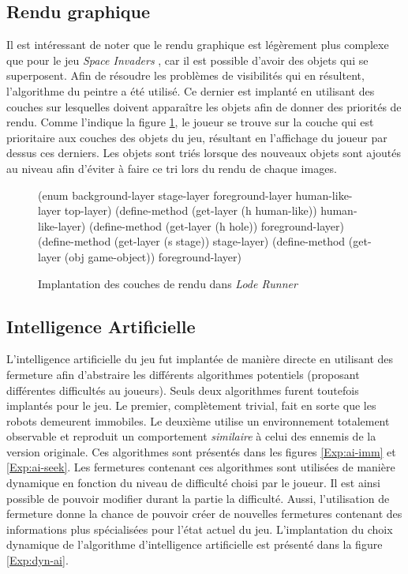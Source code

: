 \documentclass[12pt,oneside,letterpaper,francais]{book}
\newcommand{\lr}{{\textit{Lode Runner }}}
\newcommand{\si}{{\textit{Space Invaders }}}
\newcommand{\scheme}[1]{\selectlanguage{english}{\tt #1}\selectlanguage{french}}
\begin{document}
\subsection{Rendu graphique}

Il est intéressant de noter que le rendu graphique est légèrement plus
complexe que pour le jeu \si, car il est possible d'avoir des objets
qui se superposent. Afin de résoudre les problèmes de visibilités qui
en résultent, l'algorithme du peintre a été utilisé. Ce dernier est
implanté en utilisant des couches sur lesquelles doivent apparaître
les objets afin de donner des priorités de rendu. Comme l'indique la
figure \ref{Exp:layers}, le joueur se trouve sur la couche
\scheme{human-like-layer} qui est prioritaire aux couches des objets
du jeu, résultant en l'affichage du joueur par dessus ces
derniers. Les objets sont triés lorsque des nouveaux objets sont
ajoutés au niveau afin d'éviter à faire ce tri lors du rendu de chaque
images.

\begin{figure}[htb!]
  \begin{schemecode}
(enum background-layer stage-layer foreground-layer human-like-layer top-layer)
(define-method (get-layer (h human-like))    human-like-layer)
(define-method (get-layer (h hole))          foreground-layer)
(define-method (get-layer (s stage))         stage-layer)
(define-method (get-layer (obj game-object)) foreground-layer)
  \end{schemecode}
  \caption{Implantation des couches de rendu dans \lr}
  \label{Exp:layers}
\end{figure}

\subsection{Intelligence Artificielle}

L'intelligence artificielle du jeu fut implantée de manière directe en
utilisant des fermeture afin d'abstraire les différents algorithmes
potentiels (proposant différentes difficultés au joueurs). Seuls deux
algorithmes furent toutefois implantés pour le jeu. Le premier,
complètement trivial, fait en sorte que les robots demeurent
immobiles.  Le deuxième utilise un environnement totalement observable
et reproduit un comportement \emph{similaire} à celui des ennemis de
la version originale. Ces algorithmes sont présentés dans les figures
\ref{Exp:ai-imm} et \ref{Exp:ai-seek}. Les fermetures contenant ces
algorithmes sont utilisées de manière dynamique en fonction du niveau
de difficulté choisi par le joueur. Il est ainsi possible de pouvoir
modifier durant la partie la difficulté. Aussi, l'utilisation de
fermeture donne la chance de pouvoir créer de nouvelles fermetures
contenant des informations plus spécialisées pour l'état actuel du
jeu. L'implantation du choix dynamique de l'algorithme d'intelligence
artificielle est présenté dans la figure \ref{Exp:dyn-ai}.
\end{document}
